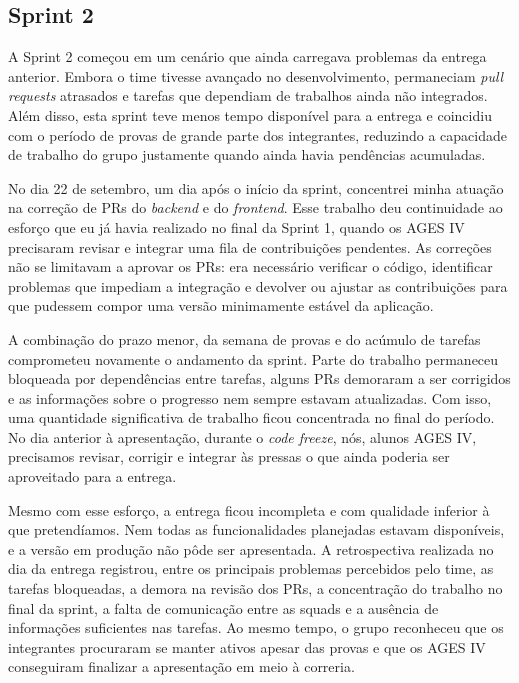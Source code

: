 \subsection{Sprint 2}

A Sprint 2 começou em um cenário que ainda carregava problemas da entrega
anterior. Embora o time tivesse avançado no desenvolvimento, permaneciam
\textit{pull requests} atrasados e tarefas que dependiam de trabalhos ainda não
integrados. Além disso, esta sprint teve menos tempo disponível para a entrega e
coincidiu com o período de provas de grande parte dos integrantes, reduzindo a
capacidade de trabalho do grupo justamente quando ainda havia pendências
acumuladas.

No dia 22 de setembro, um dia após o início da sprint, concentrei minha atuação
na correção de PRs do \textit{backend} e do \textit{frontend}. Esse trabalho deu
continuidade ao esforço que eu já havia realizado no final da Sprint 1, quando os
AGES IV precisaram revisar e integrar uma fila de contribuições pendentes. As
correções não se limitavam a aprovar os PRs: era necessário verificar o código,
identificar problemas que impediam a integração e devolver ou ajustar as
contribuições para que pudessem compor uma versão minimamente estável da
aplicação.

A combinação do prazo menor, da semana de provas e do acúmulo de tarefas
comprometeu novamente o andamento da sprint. Parte do trabalho permaneceu
bloqueada por dependências entre tarefas, alguns PRs demoraram a ser corrigidos e
as informações sobre o progresso nem sempre estavam atualizadas. Com isso, uma
quantidade significativa de trabalho ficou concentrada no final do período. No
dia anterior à apresentação, durante o \textit{code freeze}, nós, alunos AGES IV,
precisamos revisar, corrigir e integrar às pressas o que ainda poderia ser
aproveitado para a entrega.

Mesmo com esse esforço, a entrega ficou incompleta e com qualidade inferior à
que pretendíamos. Nem todas as funcionalidades planejadas estavam disponíveis,
e a versão em produção não pôde ser apresentada. A retrospectiva realizada no
dia da entrega registrou, entre os principais problemas percebidos pelo time, as
tarefas bloqueadas, a demora na revisão dos PRs, a concentração do trabalho no
final da sprint, a falta de comunicação entre as squads e a ausência de
informações suficientes nas tarefas. Ao mesmo tempo, o grupo reconheceu que os
integrantes procuraram se manter ativos apesar das provas e que os AGES IV
conseguiram finalizar a apresentação em meio à correria.

